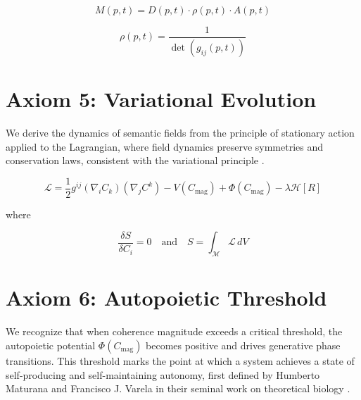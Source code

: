 \begin{equation}\label{eq:axiom_4_semantic_mass_equation}
M(p,t) = D(p,t) \cdot \rho(p,t) \cdot A(p,t)
\end{equation}

\begin{equation}
\rho(p,t) = \frac{1}{\det(g_{ij}(p,t))}
\end{equation}


\section{Axiom 5: Variational Evolution}
\label{sec:axiom_5}

We derive the dynamics of semantic fields from the principle of stationary action applied to the Lagrangian, where field dynamics preserve symmetries and conservation laws, consistent with the variational principle \autocite{GoldsteinPooleSafko2002, Arnold1989}.

\begin{equation}\label{eq:lagrangian_axiom}
\mathcal{L} = \frac{1}{2} g^{ij} (\nabla_i C_k)(\nabla_j C^k) - V(C_{\text{mag}}) + \Phi(C_{\text{mag}}) - \lambda \mathcal{H}[R]
\end{equation}

where

\begin{equation}
\frac{\delta S}{\delta C_i} = 0 \quad \text{and} \quad S = \int_{\mathcal{M}} \mathcal{L} \, dV
\end{equation}


\section{Axiom 6: Autopoietic Threshold}
\label{sec:axiom_6}

We recognize that when coherence magnitude exceeds a critical threshold, the autopoietic potential \(\Phi(C_{\text{mag}})\) becomes positive and drives generative phase transitions. This threshold marks the point at which a system achieves a state of self-producing and self-maintaining autonomy, first defined by Humberto Maturana and Francisco J. Varela in their seminal work on theoretical biology \autocite{MaturanaVarela1980}.

